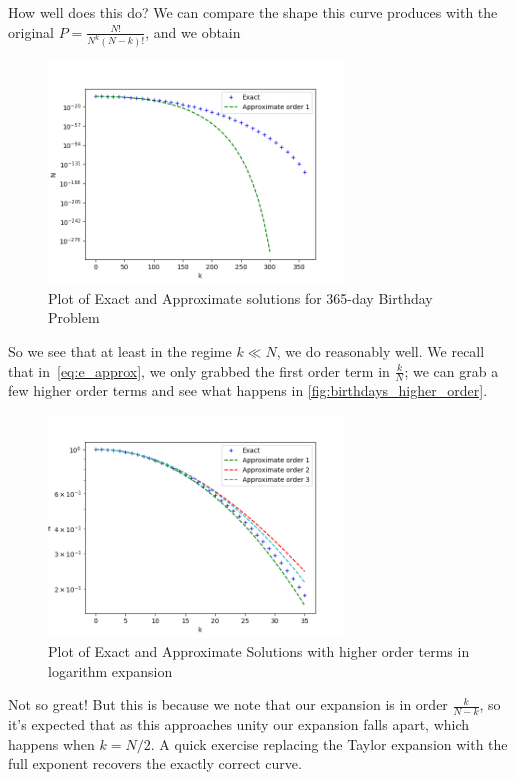 \documentclass[12pt]{report}
\begin{document}
How well does this do? We can compare the shape this curve produces with the
original $P = \frac{N!}{N^k(N-k)!}$, and we obtain
\begin{figure}[!h]
    \centering
    \includegraphics[width=0.7\textwidth]{birthdays_approx.png}
    \caption{Plot of Exact and Approximate solutions for 365-day Birthday
        Problem\label{fig:birthdays}}
\end{figure}

So we see that at least in the regime $k \ll N$, we do reasonably well. We
recall that in~\eqref{eq:e_approx}, we only grabbed the first order term in
$\frac{k}{N}$; we can grab a few higher order terms and see what happens in
\autoref{fig:birthdays_higher_order}.
\begin{figure}[!h]
    \centering
    \includegraphics[width=0.7\textwidth]{birthdays_approxorder_3.png}
    \caption{Plot of Exact and Approximate Solutions with higher order terms in
        logarithm expansion\label{fig:birthdays_higher_order}}
\end{figure}

Not so great! But this is because we note that our expansion is in order
$\frac{k}{N - k}$, so it's expected that as this approaches unity our expansion
falls apart, which happens when $k = N/2$. A quick exercise replacing the Taylor
expansion with the full exponent recovers the exactly correct curve.
\end{document}
